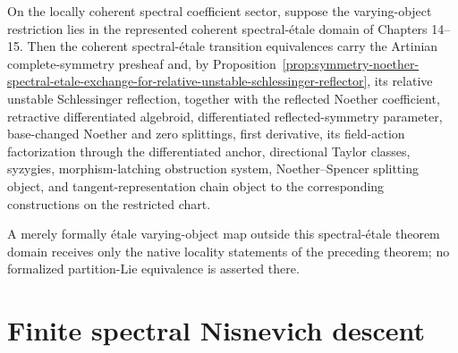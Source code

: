 \begin{proposition}
\label{prop:symmetry-noether-formal-etale-transport-of-the-formalized-branch}
On the locally coherent spectral coefficient sector, suppose the varying-object
restriction lies in the represented coherent spectral-\'etale domain of
Chapters 14--15.  Then the coherent spectral-\'etale transition equivalences carry
the Artinian complete-symmetry presheaf and, by
Proposition~\ref{prop:symmetry-noether-spectral-etale-exchange-for-relative-unstable-schlessinger-reflector},
its relative unstable Schlessinger reflection, together with the reflected Noether
coefficient, retractive differentiated algebroid,
differentiated reflected-symmetry parameter, base-changed Noether and zero
splittings, first derivative, its field-action factorization through the
differentiated anchor, directional Taylor classes, syzygies, morphism-latching
obstruction system, Noether--Spencer splitting object, and tangent-representation
chain object to the corresponding constructions on the restricted chart.

A merely formally \'etale varying-object map outside this spectral-\'etale theorem
domain receives only the native locality statements of the preceding theorem; no
formalized partition-Lie equivalence is asserted there.
\end{proposition}
\section{Finite spectral Nisnevich descent}
\label{sec:symmetry-noether-finite-spectral-nisnevich-descent}

